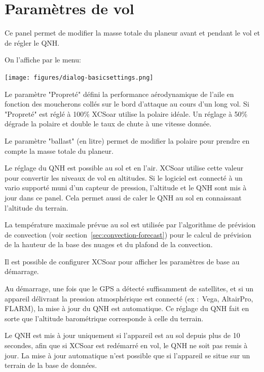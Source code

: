 \section{Paramètres de vol}\label{sec:flight-setup}
Ce panel permet de modifier la masse totale du planeur avant et pendant le vol et de régler le QNH. 

On l'affiche par le menu: 
\begin{quote}
\blink{}
\end{quote}

\begin{center}
\texttt{[image: figures/dialog-basicsettings.png]}
\end{center}

Le paramètre "Propreté" défini la performance aérodynamique de l'aile en fonction des moucherons collés sur le bord d'attaque au cours d'un long vol. Si "Propreté" est réglé à 100\% XCSoar utilise la polaire idéale. Un réglage à 50\% dégrade la polaire et double le taux de chute à une vitesse donnée.

Le paramètre "ballast" (en litre) permet de modifier la polaire pour prendre en compte la masse totale du planeur. 

Le réglage du QNH est possible au sol et en l'air. XCSoar utilise cette valeur pour convertir les niveaux de vol en altitudes. Si le logiciel est connecté à un vario supporté muni d'un capteur de pression, l'altitude et le QNH sont mis à jour dans ce panel. Cela permet aussi de caler le QNH au sol en connaissant l'altitude du terrain.

La température maximale prévue au sol est utilisée par l'algorithme de prévision de convection (voir section~\ref{sec:convection-forecast}) pour le calcul de prévision de la hauteur de la base des nuages et du plafond de la convection.

\tip Il est possible de configurer XCSoar pour afficher les paramètres de base au démarrage.

Au démarrage, une fois que le GPS a détecté suffisamment de satellites,  et si un appareil délivrant la pression atmosphérique est connecté  (ex :\ Vega, AltairPro, FLARM), la mise à jour du QNH est automatique. Ce réglage du QNH fait en sorte que l'altitude barométrique corresponde à celle du terrain.

Le QNH est mis à jour uniquement si l'appareil est au sol depuis plus de 10 secondes, afin que si XCSoar est redémarré en vol, le QNH ne soit pas remis à jour. La mise à jour automatique n'est possible que si l'appareil se situe sur un terrain de la base de données.

